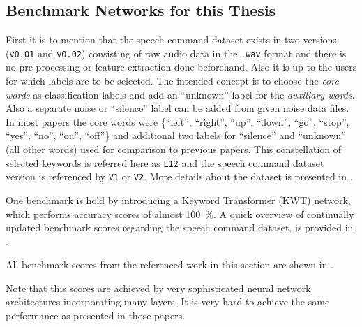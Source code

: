 \subsection{Benchmark Networks for this Thesis}\label{sec:prev_kws_benchmark}
First it is to mention that the speech command dataset \cite{Warden2018} exists in two versions (\texttt{v0.01} and \texttt{v0.02}) consisting of raw audio data in the \texttt{.wav} format and there is no pre-processing or feature extraction done beforehand.
Also it is up to the users for which labels are to be selected.
The intended concept is to choose the \emph{core words} as classification labels and add an \enquote{unknown} label for the \emph{auxiliary words}.
Also a separate noise or \enquote{silence} label can be added from given noise data files.
In most papers the core words were \{\enquote{left},  \enquote{right}, \enquote{up}, \enquote{down}, \enquote{go}, \enquote{stop}, \enquote{yes}, \enquote{no}, \enquote{on}, \enquote{off}\} and additional two labels for \enquote{silence} and \enquote{unknown} (all other words) used for comparison to previous papers.
This constellation of selected keywords is referred here as \texttt{L12} and the speech command dataset version is referenced by \texttt{V1} or \texttt{V2}.
More details about the dataset is presented in .

One benchmark is hold by \cite{Berg2021} introducing a Keyword Transformer (KWT) network, which performs accuracy scores of almost \SI{100}{\percent}.
A quick overview of continually updated benchmark scores regarding the speech command dataset, is provided in \cite{PaperswithcodeKWS}.

All benchmark scores from the referenced work in this section are shown in .

Note that this scores are achieved by very sophisticated neural network architectures incorporating many layers.
It is very hard to achieve the same performance as presented in those papers.